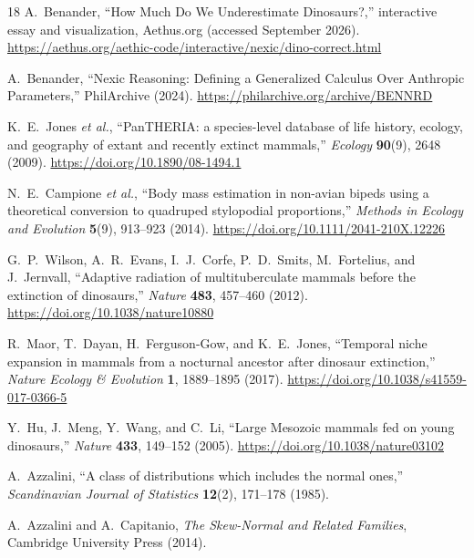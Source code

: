 \documentclass[11pt]{article}
\begin{document}
\begin{thebibliography}{18}
A.~Benander,
``How Much Do We Underestimate Dinosaurs?,'' interactive essay and visualization, Aethus.org (accessed September 2026).
\url{https://aethus.org/aethic-code/interactive/nexic/dino-correct.html}

A.~Benander,
``Nexic Reasoning: Defining a Generalized Calculus Over Anthropic Parameters,'' PhilArchive (2024).
\url{https://philarchive.org/archive/BENNRD}

K.~E.~Jones \textit{et al.},
``PanTHERIA: a species-level database of life history, ecology, and geography of extant and recently extinct mammals,''
\textit{Ecology} \textbf{90}(9), 2648 (2009).
\url{https://doi.org/10.1890/08-1494.1}

N.~E.~Campione \textit{et al.},
``Body mass estimation in non-avian bipeds using a theoretical conversion to quadruped stylopodial proportions,''
\textit{Methods in Ecology and Evolution} \textbf{5}(9), 913--923 (2014).
\url{https://doi.org/10.1111/2041-210X.12226}

G.~P.~Wilson, A.~R.~Evans, I.~J.~Corfe, P.~D.~Smits, M.~Fortelius, and J.~Jernvall,
``Adaptive radiation of multituberculate mammals before the extinction of dinosaurs,''
\textit{Nature} \textbf{483}, 457--460 (2012).
\url{https://doi.org/10.1038/nature10880}

R.~Maor, T.~Dayan, H.~Ferguson-Gow, and K.~E.~Jones,
``Temporal niche expansion in mammals from a nocturnal ancestor after dinosaur extinction,''
\textit{Nature Ecology \& Evolution} \textbf{1}, 1889--1895 (2017).
\url{https://doi.org/10.1038/s41559-017-0366-5}

Y.~Hu, J.~Meng, Y.~Wang, and C.~Li,
``Large Mesozoic mammals fed on young dinosaurs,''
\textit{Nature} \textbf{433}, 149--152 (2005).
\url{https://doi.org/10.1038/nature03102}

A.~Azzalini,
``A class of distributions which includes the normal ones,''
\textit{Scandinavian Journal of Statistics} \textbf{12}(2), 171--178 (1985).

A.~Azzalini and A.~Capitanio,
\textit{The Skew-Normal and Related Families},
Cambridge University Press (2014).


\end{thebibliography}
\end{document}
